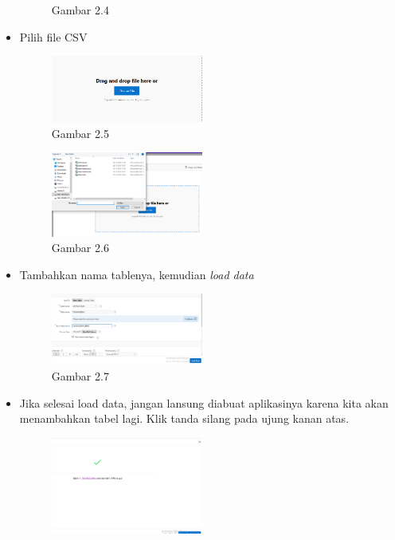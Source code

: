 \documentclass{article}
\begin{document}
\begin{itemize}
\begin{figure}[ht]
                    \caption{Gambar 2.4}
                \end{figure}
            \newpage
            \item Pilih file CSV
                \begin{figure}[ht]
                    \centerline{\includegraphics[width=5cm]{Capture11.PNG}}
                    \caption{Gambar 2.5}
                \end{figure}
                \begin{figure}[ht]
                    \centerline{\includegraphics[width=5cm]{Capture12.PNG}}
                    \caption{Gambar 2.6}
                \end{figure}
            \item Tambahkan nama tablenya, kemudian \textit{load data}
                \begin{figure}[ht]
                    \centerline{\includegraphics[width=5cm]{Capture13.PNG}}
                    \caption{Gambar 2.7}
                \end{figure}
            \newpage
            \item Jika selesai load data, jangan lansung diabuat aplikasinya karena kita akan menambahkan tabel lagi. Klik tanda silang pada ujung kanan atas.
                \begin{figure}[ht]
                    \centerline{\includegraphics[width=5cm]{Capture14.PNG}}

\end{figure}
\end{itemize}
\end{document}
